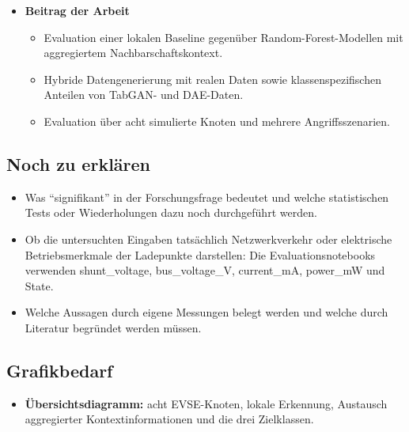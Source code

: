\begin{itemize}
\begin{itemize}
          Full-Context-Modell; ein statistischer Signifikanztest ist dort
          jedoch nicht dokumentiert.
  \end{itemize}
  \item \textbf{Beitrag der Arbeit}
  \begin{itemize}
    \item Evaluation einer lokalen Baseline gegenüber Random-Forest-Modellen
          mit aggregiertem Nachbarschaftskontext.
    \item Hybride Datengenerierung mit realen Daten sowie klassenspezifischen
          Anteilen von TabGAN- und DAE-Daten.
    \item Evaluation über acht simulierte Knoten und mehrere Angriffsszenarien.
  \end{itemize}
\end{itemize}

\subsection{Noch zu erklären}
\begin{itemize}
  \item Was ``signifikant'' in der Forschungsfrage bedeutet und welche
        statistischen Tests oder Wiederholungen dazu noch durchgeführt werden.
  \item Ob die untersuchten Eingaben tatsächlich Netzwerkverkehr oder
        elektrische Betriebsmerkmale der Ladepunkte darstellen: Die
        Evaluationsnotebooks verwenden shunt\_voltage, bus\_voltage\_V,
        current\_mA, power\_mW und State.
  \item Welche Aussagen durch eigene Messungen belegt werden und welche
        durch Literatur begründet werden müssen.
\end{itemize}

\subsection{Grafikbedarf}
\begin{itemize}
  \item \textbf{Übersichtsdiagramm:} acht EVSE-Knoten, lokale Erkennung,
        Austausch aggregierter Kontextinformationen und die drei Zielklassen.
\end{itemize}
